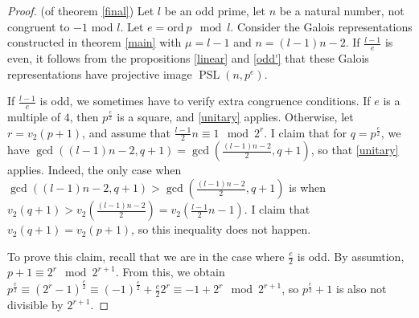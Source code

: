 \documentclass[10pt,a4paper]{amsart}
\DeclareMathOperator{\PSL}{\mathrm{PSL}}
\begin{document}
	\begin{proof} (of theorem \ref{final})
		Let $l$ be an odd prime, let $n$ be a natural number, not congruent to $-1$ mod $l$. Let $e = \mathrm{ord}\ p \mod l$. Consider the Galois representations constructed in theorem \ref{main} with $\mu = l-1$ and $n = (l-1)n - 2$. If $\frac{l-1}{e}$ is even, it follows from the propositions \ref{linear} and \ref{odd'} that these Galois representations have projective image $\PSL(n,p^e)$. \par 
		If $\frac{l-1}{e}$ is odd, we sometimes have to verify extra congruence conditions. If $e$ is a multiple of $4$, then $p^{\frac{e}{2}}$ is a square, and \ref{unitary} applies. Otherwise, let $r = v_2(p+1)$, and assume that $\frac{l-1}{2} n \equiv 1 \mod 2^r$. I claim that for $q=p^{\frac{e}{2}}$, we have $\gcd((l-1)n-2,q+1)=\gcd(\frac{(l-1)n-2}{2},q+1)$, so that \ref{unitary} applies. Indeed, the only case when $\gcd((l-1)n-2,q+1)>\gcd(\frac{(l-1)n-2}{2},q+1)$ is when $v_2(q+1) > v_2(\frac{(l-1)n-2}{2})= v_2(\frac{l-1}{2}n - 1)$. I claim that $v_2(q+1) = v_2(p+1)$, so this inequality does not happen. \par 
		To prove this claim, recall that we are in the case where $\frac{e}{2}$ is odd. By assumtion, $p + 1 \equiv 2^r \mod 2^{r+1}$. From this, we obtain $p^{\frac{e}{2}} \equiv (2^r - 1)^{\frac{e}{2}} \equiv (-1)^{\frac{e}{2}} + \frac{e}{2} 2^r \equiv -1 + 2^r \mod 2^{r+1}$, so $p^{\frac{e}{2}} + 1$ is also not divisible by $2^{r+1}$.
	\end{proof}
\end{document}
